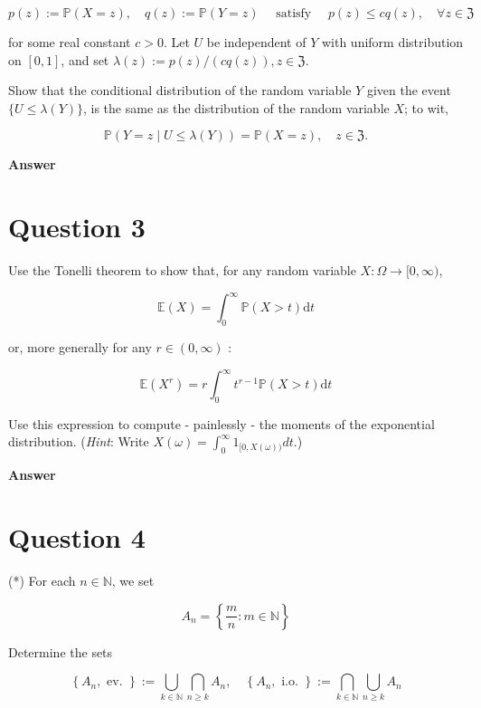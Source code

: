 \documentclass[letterpaper]{article}
\begin{document}
		$$
		p(z):=\mathbb{P}(X=z), \quad q(z):=\mathbb{P}(Y=z) \quad \text { satisfy } \quad p(z) \leq c q(z), \quad \forall z \in \mathfrak{Z}
		$$
		
		for some real constant $c>0$. Let $U$ be independent of $Y$ with uniform distribution on $[0,1]$, and set $\lambda(z):=p(z) /(c q(z)), z \in \mathfrak{Z}$.
		
		Show that the conditional distribution of the random variable $Y$ given the event $\{U \leq \lambda(Y)\}$, is the same as the distribution of the random variable $X$; to wit,
		
		$$
		\mathbb{P}(Y=z \mid U \leq \lambda(Y))=\mathbb{P}(X=z), \quad z \in \mathfrak{Z} .
		$$
		
		
		\textbf{Answer}
		
		\clearpage
		
		\section{Question 3}
		
		Use the Tonelli theorem to show that, for any random variable $X: \Omega \rightarrow [0, \infty)$,
		
		$$
		\mathbb{E}(X)=\int_{0}^{\infty} \mathbb{P}(X>t) \mathrm{d} t
		$$
		
		or, more generally for any $r \in(0, \infty)$ :
		
		$$
		\mathbb{E}\left(X^{r}\right)=r \int_{0}^{\infty} t^{r-1} \mathbb{P}(X>t) \mathrm{d} t
		$$
		
		Use this expression to compute - painlessly - the moments of the exponential distribution. (\emph{Hint}: Write $X(\omega)=\int_{0}^{\infty} 1_{[0, X(\omega))} d t$.)
		
		
		\textbf{Answer}
		
		\clearpage
		
		\section{Question 4}
		
		(*) For each $n \in \mathbb{N}$, we set
		
		$$
		A_{n}=\left\{\frac{m}{n}: m \in \mathbb{N}\right\}
		$$
		
		Determine the sets
		
		$$
		\left\{A_{n}, \text { ev. }\right\}:=\bigcup_{k \in \mathbb{N}} \bigcap_{n \geq k} A_{n}, \quad\left\{A_{n}, \text { i.o. }\right\}:=\bigcap_{k \in \mathbb{N}} \bigcup_{n \geq k} A_{n}
		$$
		
\end{document}
